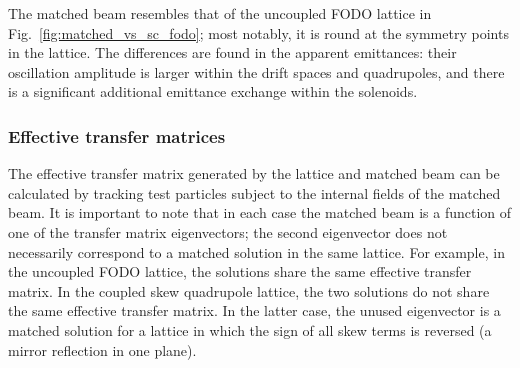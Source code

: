 %
The matched beam resembles that of the uncoupled FODO lattice in Fig.~\ref{fig:matched_vs_sc_fodo}; most notably, it is round at the symmetry points in the lattice. The differences are found in the apparent emittances: their oscillation amplitude is larger within the drift spaces and quadrupoles, and there is a significant additional emittance exchange within the solenoids. 


\subsubsection{Effective transfer matrices}

The effective transfer matrix generated by the lattice and matched beam can be calculated by tracking test particles subject to the internal fields of the matched beam. It is important to note that in each case the matched beam is a function of one of the transfer matrix eigenvectors; the second eigenvector does not necessarily correspond to a matched solution in the same lattice. For example, in the uncoupled FODO lattice, the solutions share the same effective transfer matrix. In the coupled skew quadrupole lattice, the two solutions do not share the same effective transfer matrix. In the latter case, the unused eigenvector is a matched solution for a lattice in which the sign of all skew terms is reversed (a mirror reflection in one plane). 


